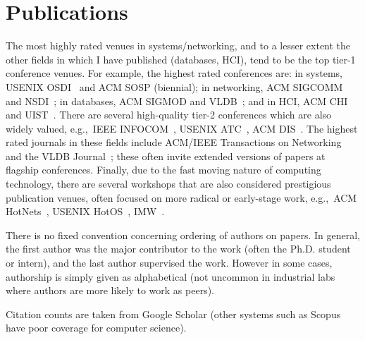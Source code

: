 \documentclass[11pt]{article}
\begin{document}
\part*{Publications}

The most highly rated venues in systems/networking, and to a lesser extent the other fields in which I have published (databases, HCI), tend to be the top tier-1 conference venues. For example, the highest rated conferences are: in systems, USENIX OSDI~\cite{barham04:using.magpie} and ACM SOSP (biennial); in networking, ACM SIGCOMM~\cite{karagiannis08:networ} and NSDI~\cite{cooke06:dark.oracl}; in databases, ACM SIGMOD and VLDB~\cite{narayanan06:delay.seaweed}; and in HCI, ACM CHI and UIST~\cite{mortier12:homew}. There are several high-quality tier-2 conferences which are also widely valued, e.g.,~IEEE INFOCOM~\cite{kosta12:think}, USENIX ATC~\cite{cooke06:reclaim}, ACM DIS~\cite{crabtree12:unrem.networ}. The highest rated journals in these fields include ACM/IEEE Transactions on Networking~\cite{fay10:weigh.spect.distr.inter.topol.analy} and the VLDB Journal~\cite{narayanan08:delay.seaweed}; these often invite extended versions of papers at flagship conferences. Finally, due to the fast moving nature of computing technology, there are several workshops that are also considered prestigious publication venues, often focused on more radical or early-stage work, e.g.,~ACM HotNets~\cite{bahl06:discov.depen.networ.manag,roscoe02:predic.routin}, USENIX HotOS~\cite{barham03:magpie,stratford99:econom.approac.adapt.resour.manag}, IMW~\cite{hengartner02:routin.loops,iannacone02:analy.link.failur.ip.backb}.

There is no fixed convention concerning ordering of authors on papers. In general, the first author was the major contributor to the work (often the Ph.D. student or intern), and the last author supervised the work. However in some cases, authorship is simply given as alphabetical (not uncommon in industrial labs where authors are more likely to work as peers).

Citation counts are taken from Google Scholar (other systems such as Scopus have poor coverage for computer science).

{
  \newrefsection[journal]
  \nocite{*}
  \printbibliography[title=Journal]

  \newrefsection[conference]
  \nocite{*}
  \printbibliography[title=Peer-Reviewed Conference]

  \newrefsection[workshop]
  \nocite{*}
  \printbibliography[title=Peer-Reviewed Workshop]

  \newrefsection[patent]
  \nocite{*}
  \printbibliography[title=Patents]

  \newrefsection[techreport]
  \nocite{*}
  \printbibliography[title=Technical Reports]
}
\end{document}
